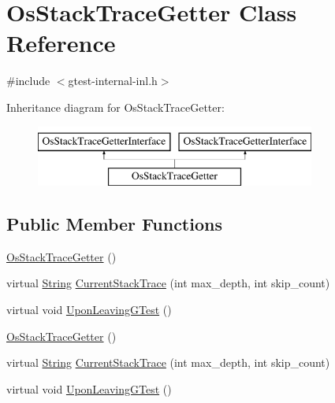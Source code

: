 \hypertarget{classtesting_1_1internal_1_1OsStackTraceGetter}{\section{\-Os\-Stack\-Trace\-Getter \-Class \-Reference}
\label{df/de4/classtesting_1_1internal_1_1OsStackTraceGetter}
}


{\ttfamily \#include $<$gtest-\/internal-\/inl.\-h$>$}

\-Inheritance diagram for \-Os\-Stack\-Trace\-Getter\-:\begin{figure}[H]
\begin{center}
\leavevmode
\includegraphics[height=2.000000cm]{df/de4/classtesting_1_1internal_1_1OsStackTraceGetter}
\end{center}
\end{figure}
\subsection*{\-Public \-Member \-Functions}
\begin{DoxyCompactItemize}
\item 
\hyperlink{classtesting_1_1internal_1_1OsStackTraceGetter_abff80fc4b0b474cf8fa4f44b3e5c3a9e}{\-Os\-Stack\-Trace\-Getter} ()
\item 
virtual \hyperlink{classtesting_1_1internal_1_1String}{\-String} \hyperlink{classtesting_1_1internal_1_1OsStackTraceGetter_aaa023d94e63f7975bfbe9ca54a9acd07}{\-Current\-Stack\-Trace} (int max\-\_\-depth, int skip\-\_\-count)
\item 
virtual void \hyperlink{classtesting_1_1internal_1_1OsStackTraceGetter_aa97e532da98f524272b1256f018c0f07}{\-Upon\-Leaving\-G\-Test} ()
\item 
\hyperlink{classtesting_1_1internal_1_1OsStackTraceGetter_abff80fc4b0b474cf8fa4f44b3e5c3a9e}{\-Os\-Stack\-Trace\-Getter} ()
\item 
virtual \hyperlink{classtesting_1_1internal_1_1String}{\-String} \hyperlink{classtesting_1_1internal_1_1OsStackTraceGetter_a870d7574831ade2d93875cd67ac725e6}{\-Current\-Stack\-Trace} (int max\-\_\-depth, int skip\-\_\-count)
\item 
virtual void \hyperlink{classtesting_1_1internal_1_1OsStackTraceGetter_ad3912ec6b3c8c171975114d79a94eb05}{\-Upon\-Leaving\-G\-Test} ()
\end{DoxyCompactItemize}
